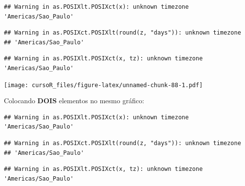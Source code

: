 \documentclass[]{book}
\newenvironment{Shaded}{\begin{snugshade}}{\end{snugshade}}
\newcommand{\KeywordTok}[1]{\textcolor[rgb]{0.13,0.29,0.53}{\textbf{#1}}}
\newcommand{\DataTypeTok}[1]{\textcolor[rgb]{0.13,0.29,0.53}{#1}}
\newcommand{\DecValTok}[1]{\textcolor[rgb]{0.00,0.00,0.81}{#1}}
\newcommand{\StringTok}[1]{\textcolor[rgb]{0.31,0.60,0.02}{#1}}
\newcommand{\CommentTok}[1]{\textcolor[rgb]{0.56,0.35,0.01}{\textit{#1}}}
\newcommand{\OperatorTok}[1]{\textcolor[rgb]{0.81,0.36,0.00}{\textbf{#1}}}
\newcommand{\NormalTok}[1]{#1}
\theoremstyle{definition}
\theoremstyle{definition}
\theoremstyle{definition}
\theoremstyle{remark}
\begin{document}
\begin{verbatim}
## Warning in as.POSIXlt.POSIXct(x): unknown timezone 'Americas/Sao_Paulo'
\end{verbatim}

\begin{verbatim}
## Warning in as.POSIXct.POSIXlt(round(z, "days")): unknown timezone
## 'Americas/Sao_Paulo'
\end{verbatim}

\begin{verbatim}
## Warning in as.POSIXlt.POSIXct(x, tz): unknown timezone 'Americas/Sao_Paulo'
\end{verbatim}

\texttt{[image: cursoR\_files/figure-latex/unnamed-chunk-88-1.pdf]}

Colocando \textbf{DOIS} elementos no mesmo gráfico:

\begin{Shaded}
\end{Shaded}

\begin{verbatim}
## Warning in as.POSIXlt.POSIXct(x): unknown timezone 'Americas/Sao_Paulo'
\end{verbatim}

\begin{verbatim}
## Warning in as.POSIXct.POSIXlt(round(z, "days")): unknown timezone
## 'Americas/Sao_Paulo'
\end{verbatim}

\begin{verbatim}
## Warning in as.POSIXlt.POSIXct(x, tz): unknown timezone 'Americas/Sao_Paulo'
\end{verbatim}
\end{document}
